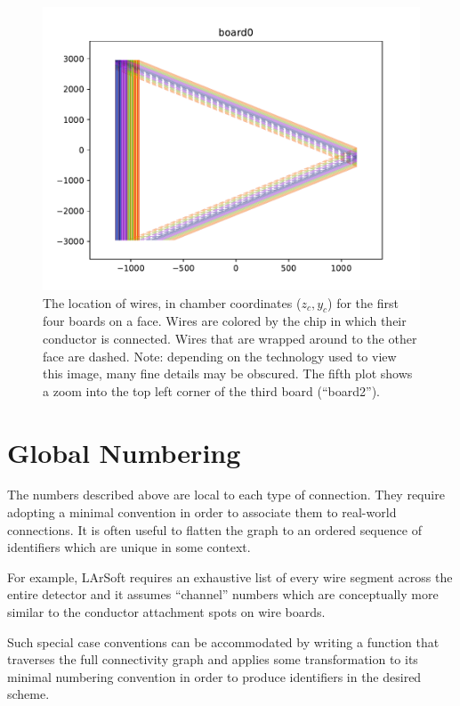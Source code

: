 \documentclass[pdftex,12pt,letter]{article}
\begin{document}
\begin{figure}[h]
  \includegraphics[width=\textwidth,page=3,clip,trim=3cm 8cm 8cm 2cm]{test_plot_board.pdf}

  \caption{The location of wires, in chamber coordinates ($z_c,y_c$)
    for the first four boards on a face.  Wires are colored by the
    chip in which their conductor is connected.  Wires that are
    wrapped around to the other face are dashed.  Note: depending on
    the technology used to view this image, many fine details may be
    obscured.  The fifth plot shows a zoom into the top left corner of
    the third board (``board2'').}
  \label{fig:board}
\end{figure}


\section{Global Numbering}

The numbers described above are local to each type of connection.
They require adopting a minimal convention in order to associate them
to real-world connections.  It is often useful to flatten the graph to
an ordered sequence of identifiers which are unique in some context.

For example, LArSoft requires an exhaustive list of every wire segment
across the entire detector and it assumes ``channel'' numbers which
are conceptually more similar to the conductor attachment spots on
wire boards.

Such special case conventions can be accommodated by writing a
function that traverses the full connectivity graph and applies some
transformation to its minimal numbering convention in order to produce
identifiers in the desired scheme.
\end{document}

